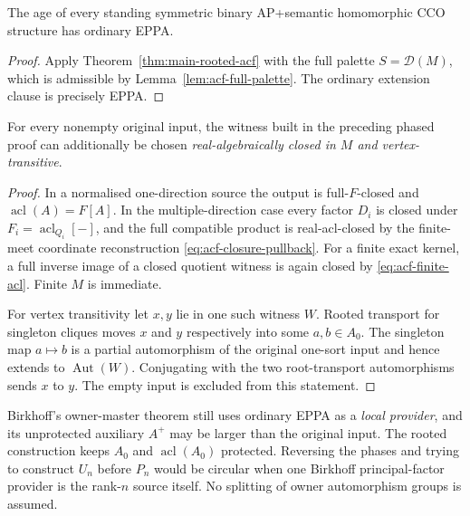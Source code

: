 \begin{corollary}
\label{thm:main-ordinary-eppa}
The age of every standing symmetric binary AP+semantic
homomorphic CCO structure has ordinary EPPA.
\end{corollary}
\begin{proof}
Apply Theorem~\ref{thm:main-rooted-acf} with the full
palette $S=\mathcal D(M)$, which is admissible by
Lemma~\ref{lem:acf-full-palette}.  The ordinary
extension clause is precisely EPPA.
\end{proof}

\begin{corollary}
\label{cor:acf-closed-transitive}
For every nonempty original input, the witness built in the
preceding phased proof can additionally be chosen
\emph{real-algebraically closed in $M$ and vertex-transitive}.
\end{corollary}
\begin{proof}
In a normalised one-direction source the output is
full-$F$-closed and $\operatorname{acl}(A)=F[A]$.
In the multiple-direction case every factor $D_i$ is
closed under $F_i=\operatorname{acl}_{Q_i}[-]$, and
the full compatible product is real-acl-closed by the
finite-meet coordinate reconstruction
\eqref{eq:acf-closure-pullback}.
For a finite exact kernel, a full inverse image of a
closed quotient witness is again closed by
\eqref{eq:acf-finite-acl}.  Finite $M$ is immediate.

For vertex transitivity let $x,y$ lie in one such
witness $W$.  Rooted transport for singleton cliques
moves $x$ and $y$ respectively into some $a,b\in A_0$.
The singleton map $a\mapsto b$ is a partial automorphism
of the original one-sort input and hence extends to
$\operatorname{Aut}(W)$.  Conjugating with the two
root-transport automorphisms sends $x$ to $y$.
The empty input is excluded from this statement.
\end{proof}

\begin{remark}
Birkhoff's owner-master theorem still uses ordinary EPPA
as a \emph{local provider}, and its unprotected auxiliary
$A^+$ may be larger than the original input.  The
rooted construction keeps $A_0$ and $\operatorname{acl}(A_0)$
protected.  Reversing the phases and trying to construct
$U_n$ before $P_n$ would be circular when one Birkhoff
principal-factor provider is the rank-$n$ source itself.
No splitting of owner automorphism groups is assumed.
\end{remark}
